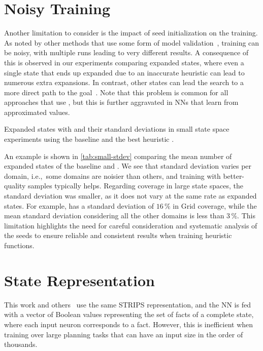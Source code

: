 \section{Noisy Training}
\label{sec:noisy-training}

Another limitation to consider is the impact of seed initialization on the training. As noted by other methods that use some form of model validation~\cite{ferber2020neural, shen2020learning, ferber2022neural, otoole2022sampling}, training can be noisy, with multiple runs leading to very different results. A consequence of this is observed in our experiments comparing expanded states, where even a single state that ends up expanded due to an inaccurate heuristic can lead to numerous extra expansions. In contrast, other states can lead the search to a more direct path to the goal~\cite{heusner2017understanding}. Note that this problem is common for all approaches that use \gbfs, but this is further aggravated in NNs that learn from approximated values.

\begin{table}[tb]
    \caption[Expanded states with standard deviations in small state space experiments.]{Expanded states with \gbfs and their standard deviations in small state space experiments using the baseline \hnnbase and the best heuristic \hnnrs.}
    \label{tab:small-stdev}
    \addmargin
    \centering
    
\end{table}

An example is shown in \cref{tab:small-stdev} comparing the mean number of expanded states of the baseline and \hnnrs. We see that standard deviation varies per domain, i.e.,~some domains are noisier than others, and training with better-quality samples typically helps. Regarding coverage in large state spaces, the standard deviation was smaller, as it does not vary at the same rate as expanded states. For example, \hnnrs has a standard deviation of $16\,\%$ in Grid coverage, while the mean standard deviation considering all the other domains is less than $3\,\%$. This limitation highlights the need for careful consideration and systematic analysis of the seeds to ensure reliable and consistent results when training heuristic functions.

\section{State Representation}
\label{sec:limitation-representation}

This work and others~\cite{ferber2020neural, ferber2022neural, otoole2022sampling} use the same STRIPS representation, and the NN is fed with a vector of Boolean values representing the set of facts of a complete state, where each input neuron corresponds to a fact. However, this is inefficient when training over large planning tasks that can have an input size in the order of thousands.

